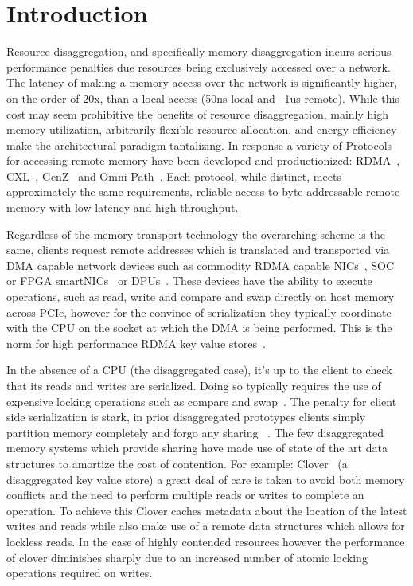 \section{Introduction}

Resource disaggregation, and specifically memory disaggregation incurs serious
performance penalties due resources being exclusively accessed over a network.
The latency of making a memory access over the network is significantly higher,
on the order of 20x, than a local access (50ns local and ~1us remote).  While
this cost may seem prohibitive the benefits of resource disaggregation, mainly
high memory utilization, arbitrarily flexible resource allocation, and energy
efficiency~\cite{zombieland} make the architectural paradigm tantalizing. In
response a variety of Protocols for accessing remote memory have been developed
and productionized: RDMA~\cite{infiniband-spec}, CXL~\cite{cxl},
GenZ~\cite{genz} and Omni-Path~\cite{omni-path}. Each protocol, while distinct,
meets approximately the same requirements, reliable access to byte addressable
remote memory with low latency and high throughput.


Regardless of the memory transport technology the overarching scheme is the
same, clients request remote addresses which is translated and transported via  
DMA capable network devices such as commodity RDMA capable NICs~\cite{connectx},
SOC~\cite{cavium} or FPGA smartNICs~\cite{corundum,kv-direct} or
DPUs~\cite{fungible}.  These devices have the ability to execute operations,
such as read, write and compare and swap directly on host memory across PCIe,
however for the convince of serialization they typically coordinate with the CPU
on the socket at which the DMA is being performed. This is the norm for high
performance RDMA key value stores~\cite{cliquemap,erpc,herd,sonuma,storm}. 

In the absence of a CPU (the disaggregated case), it's up to the client to check
that its reads and writes are serialized. Doing so typically requires the use of
expensive locking operations such as compare and
swap~\cite{design-guidelines,clover}.  The penalty for client side serialization
is stark, in prior disaggregated prototypes clients simply partition memory
completely and forgo any sharing ~\cite{reigons,fastswap, legoos}. The few
disaggregated memory systems which provide sharing have made use of state of the
art data structures to amortize the cost of contention. For example:
Clover~\cite{clover} (a disaggregated key value store) a great deal of care is
taken to avoid both memory conflicts and the need to perform multiple reads or
writes to complete an operation. To achieve this Clover caches metadata about
the location of the latest writes and reads while also make use of a remote data
structures which allows for lockless reads. In the case of highly contended
resources however the performance of clover diminishes sharply due to an
increased number of atomic locking operations required on writes.

